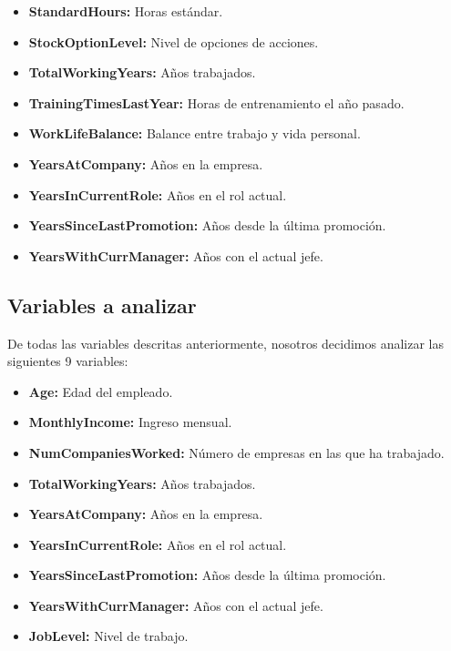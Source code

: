 \begin{itemize}
    \item \textbf{StandardHours:} Horas estándar.
    \item \textbf{StockOptionLevel:} Nivel de opciones de acciones.
    \item \textbf{TotalWorkingYears:} Años trabajados.
    \item \textbf{TrainingTimesLastYear:} Horas de entrenamiento el año pasado.
    \item \textbf{WorkLifeBalance:} Balance entre trabajo y vida personal.
    \item \textbf{YearsAtCompany:} Años en la empresa.
    \item \textbf{YearsInCurrentRole:} Años en el rol actual.
    \item \textbf{YearsSinceLastPromotion:} Años desde la última promoción.
    \item \textbf{YearsWithCurrManager:} Años con el actual jefe.
\end{itemize}


\subsection{Variables a analizar}
De todas las variables descritas anteriormente, nosotros decidimos analizar las
siguientes 9 variables:
\begin{itemize}
    \item \textbf{Age:} Edad del empleado.
    \item \textbf{MonthlyIncome:} Ingreso mensual.
    \item \textbf{NumCompaniesWorked:} Número de empresas en las que ha trabajado.
    \item \textbf{TotalWorkingYears:} Años trabajados.
    \item \textbf{YearsAtCompany:} Años en la empresa.
    \item \textbf{YearsInCurrentRole:} Años en el rol actual.
    \item \textbf{YearsSinceLastPromotion:} Años desde la última promoción.
    \item \textbf{YearsWithCurrManager:} Años con el actual jefe.
    \item \textbf{JobLevel:} Nivel de trabajo.
\end{itemize}